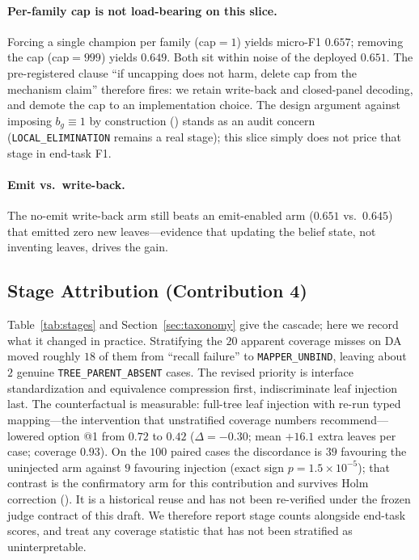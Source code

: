 \paragraph{Per-family cap is not load-bearing on this slice.}
Forcing a single champion per family (cap${=}1$) yields micro-F1 $0.657$; removing the cap (cap${=}999$) yields $0.649$.
Both sit within noise of the deployed $0.651$.
The pre-registered clause ``if uncapping does not harm, delete cap from the mechanism claim'' therefore fires: we retain write-back and closed-panel decoding, and demote the cap to an implementation choice.
The design argument against imposing $b_g{\equiv}1$ by construction () stands as an audit concern (\texttt{LOCAL\_ELIMINATION} remains a real stage); this slice simply does not price that stage in end-task F1.

\paragraph{Emit vs.\ write-back.}
The no-emit write-back arm still beats an emit-enabled arm ($0.651$ vs.\ $0.645$) that emitted zero new leaves---evidence that updating the belief state, not inventing leaves, drives the gain.

\subsection{Stage Attribution (Contribution 4)}
\label{sec:res-tax}

Table~\ref{tab:stages} and Section~\ref{sec:taxonomy} give the cascade; here we record what it changed in practice.
Stratifying the $20$ apparent coverage misses on DA moved roughly $18$ of them from ``recall failure'' to \texttt{MAPPER\_UNBIND}, leaving about $2$ genuine \texttt{TREE\_PARENT\_ABSENT} cases.
The revised priority is interface standardization and equivalence compression first, indiscriminate leaf injection last.
The counterfactual is measurable: full-tree leaf injection with re-run typed mapping---the intervention that unstratified coverage numbers recommend---lowered option @1 from $0.72$ to $0.42$ ($\Delta{=}{-}0.30$; mean ${+}16.1$ extra leaves per case; coverage $0.93$).
On the $100$ paired cases the discordance is $39$ favouring the uninjected arm against $9$ favouring injection (exact sign $p{=}1.5{\times}10^{-5}$); that contrast is the confirmatory arm for this contribution and survives Holm correction ().
It is a historical reuse and has not been re-verified under the frozen judge contract of this draft.
We therefore report stage counts alongside end-task scores, and treat any coverage statistic that has not been stratified as uninterpretable.

